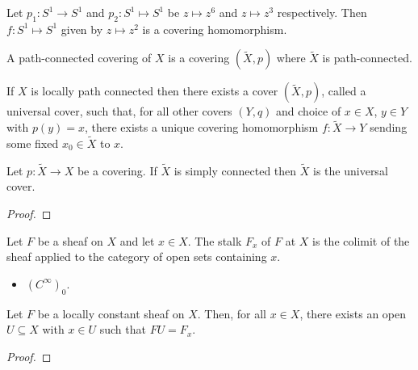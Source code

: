 \documentclass{article}
\begin{document}
\begin{example}
  Let $p_1 : S^1 \to S^1$ and $p_2 : S^1 \mapsto S^1$ be $z \mapsto z^6$ and $z \mapsto z^3$ respectively. 
  Then $f : S^1 \mapsto S^1$ given by $z \mapsto z^2$ is a covering homomorphism. 
\end{example}

\begin{definition}
  A path-connected covering of $X$ is a covering $(\tilde X,p)$ where $\tilde X$ is
  path-connected.
\end{definition}

\begin{theorem}
  If $X$ is locally path connected then there exists a cover
  $(\tilde X,p)$, called a universal cover, such that, for all other covers $(Y,q)$ 
  and choice of $x\in X$, $y\in Y$ with $p(y)=x$, there exists a unique covering 
  homomorphism $f: \tilde X \to Y$ sending some fixed $x_0 \in \tilde X$ to $x$.
\end{theorem}

\begin{example}
  \missingexample
\end{example}

\begin{theorem}
  Let $p:\tilde X\to X$ be a covering. If $\tilde X$ is simply connected then
  $\tilde X$ is the universal cover.
  \begin{proof}
    \missingproof
  \end{proof}
\end{theorem}

\begin{definition}
  Let $F$ be a sheaf on $X$ and let $x\in X$. The stalk $F_x$ of $F$ at $X$ is the
  colimit of the sheaf applied to the category of open sets containing $x$.
\end{definition}

\begin{example}
  \begin{itemize}
    \item $(C^\infty)_0$.
  \end{itemize}
\end{example}

\begin{lemma}
  Let $F$ be a locally constant sheaf on $X$. Then, for all $x\in X$, there exists
  an open $U\subseteq X$ with $x\in U$ such that $FU=F_x$.
  \begin{proof}
    \missingproof
  \end{proof}
\end{lemma}
\end{document}
